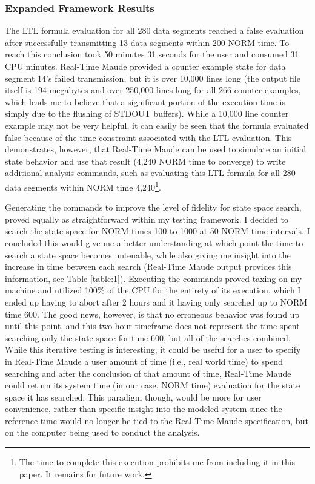 \documentclass[10pt, journal]{IEEEtran}
\begin{document}
\subsubsection{Expanded Framework Results}
The LTL formula evaluation for all 280 data segments reached a false evaluation after successfully transmitting 13 data segments within 200 NORM time. To reach this conclusion took 50 minutes 31 seconds for the user and consumed 31 CPU minutes. Real-Time Maude provided a counter example state for data segment 14's failed transmission, but it is over 10,000 lines long (the output file itself is 194 megabytes and over 250,000 lines long for all 266 counter examples, which leads me to believe that a significant portion of the execution time is simply due to the flushing of STDOUT buffers). While a 10,000 line counter example may not be very helpful, it can easily be seen that the formula evaluated false because of the time constraint associated with the LTL evaluation. This demonstrates, however, that Real-Time Maude can be used to simulate an initial state behavior and use that result (4,240 NORM time to converge) to write additional analysis commands, such as evaluating this LTL formula for all 280 data segments within NORM time 4,240\footnote{The time to complete this execution prohibits me from including it in this paper. It remains for future work.}.

Generating the commands to improve the level of fidelity for state space search, proved equally as straightforward within my testing framework. I decided to search the state space for NORM times 100 to 1000 at 50 NORM time intervals. I concluded this would give me a better understanding at which point the time to search a state space becomes untenable, while also giving me insight into the increase in time between each search (Real-Time Maude output provides this information, see Table \ref{table:1}). Executing the commands proved taxing on my machine and utilized 100\% of the CPU for the entirety of its execution, which I ended up having to abort after 2 hours and it having only searched up to NORM time 600. The good news, however, is that no erroneous behavior was found up until this point, and this two hour timeframe does not represent the time spent searching only the state space for time 600, but all of the searches combined. While this iterative testing is interesting, it could be useful for a user to specify in Real-Time Maude a user amount of time (i.e., real world time) to spend searching and after the conclusion of that amount of time, Real-Time Maude could return its system time (in our case, NORM time) evaluation for the state space it has searched. This paradigm though, would be more for user convenience, rather than specific insight into the modeled system since the reference time would no longer be tied to the Real-Time Maude specification, but on the computer being used to conduct the analysis.
\end{document}
